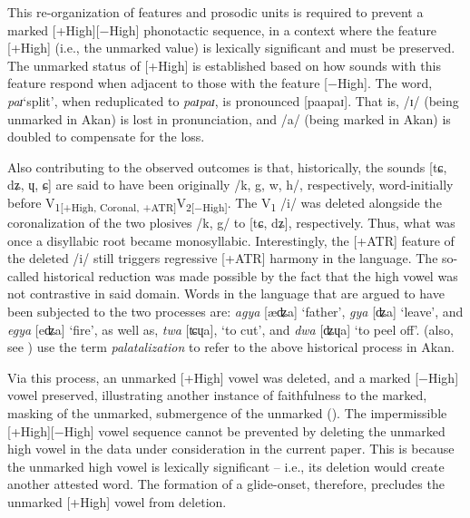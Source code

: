 \documentclass[output=paper,colorlinks,citecolor=brown]{langscibook}
\begin{document}
This re-organization of features and prosodic units is required to prevent a  marked [+High][−High] phonotactic sequence, in a context where the feature [+High] (i.e., the unmarked value) is lexically significant and must be preserved. The unmarked status of [+High] is established based on how sounds with this feature respond when adjacent to those with the feature [−High]. The word, \textit{paɪ}‘split', when reduplicated to \textit{paɪpaɪ}, is pronounced [paapaɪ]. That is, /ɪ/ (being unmarked in Akan) is lost in pronunciation, and /a/ (being marked in Akan) is doubled to compensate for the loss. 

Also contributing to the observed outcomes is that, historically, the sounds [tɕ, dʑ, ɥ, ɕ] are said to have been originally /k, g, w, h/, respectively, word-initially before V\textsubscript{1[+High, Coronal, +ATR]}V\textsubscript{2[−High]}. The V\textsubscript{1} /i/ was deleted alongside the coronalization of the two plosives /k, g/ to [tɕ, dʑ], respectively. Thus,  what was once a disyllabic root became monosyllabic. Interestingly, the [+ATR] feature of the deleted /i/ still triggers regressive [+ATR] harmony in the language. The so-called historical reduction was made possible by the fact that the high vowel was not contrastive in said domain. Words in the language that are argued to have been subjected to the two processes are: \textit{agya} [æʥa] ‘father', \textit{gya} [ʥa] ‘leave', and \textit{egya} [eʥa] ‘fire', as well as, \textit{twa} [ʨɥa], ‘to cut', and \textit{dwa} [ʥɥa] ‘to peel off'.  (also, see ) use the  term \textit{palatalization} to refer to the above historical process in Akan.

\begin{sloppypar}
Via this process, an  unmarked [+High] vowel was deleted, and a marked [−High] vowel preserved, illustrating another instance of faithfulness to the marked, masking of the unmarked, submergence of the unmarked (\citealt{deLacy2002,deLacy2006,Rice1999,Rice2002}). The impermissible [+High][−High] vowel sequence cannot be prevented by deleting the unmarked high vowel in the data under consideration in the current paper. This is because the unmarked high vowel is lexically significant – i.e., its deletion would create another attested word. The formation of a glide-onset, therefore, precludes the unmarked [+High] vowel from deletion.%
\end{sloppypar}
\end{document}

